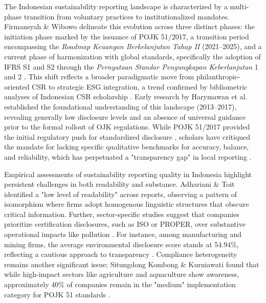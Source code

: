 \documentclass[english, online, cse, master]{dithesis}
\begin{document}
The Indonesian sustainability reporting landscape is characterized by a multi-phase transition from voluntary practices to institutionalized mandates. Firmansyah \& Wibowo  \parencite{amrie_firmansyah_200ee100} delineate this evolution across three distinct phases: the initiation phase marked by the issuance of POJK 51/2017, a transition period encompassing the \textit{Roadmap Keuangan Berkelanjutan Tahap II} (2021–2025), and a current phase of harmonization with global standards, specifically the adoption of IFRS S1 and S2 through the \textit{Pernyataan Standar Pengungkapan Keberlanjutan} 1 and 2  \parencite{amrie_firmansyah_200ee100}. This shift reflects a broader paradigmatic move from philanthropic-oriented CSR to strategic ESG integration, a trend confirmed by bibliometric analyses of Indonesian CSR scholarship  \parencite{boubacar_demba_barry_a607dad2}. Early research by Harymawan et al.  \parencite{iman_harymawan_2ef898fe} established the foundational understanding of this landscape (2013–2017), revealing generally low disclosure levels and an absence of universal guidance prior to the formal rollout of OJK regulations. While POJK 51/2017 provided the initial regulatory push for standardized disclosure  \parencite[]{alfonsa_roselina_purnomo_d67da232, kuat_waluyo_jati_45c636dc}, scholars have critiqued the mandate for lacking specific qualitative benchmarks for accuracy, balance, and reliability, which has perpetuated a "transparency gap" in local reporting  \parencite{atika_atika_588ee68a}.

Empirical assessments of sustainability reporting quality in Indonesia highlight persistent challenges in both readability and substance. Adhariani \& Toit  \parencite{desi_adhariani_toit_543335d6} identified a "low level of readability" across reports, observing a pattern of isomorphism where firms adopt homogenous linguistic structures that obscure critical information. Further, sector-specific studies suggest that companies prioritize certification disclosures, such as ISO or PROPER, over substantive operational impacts like pollution  \parencite{indah_fajarini_sri_wahyuningrum_1ce983fb}. For instance, among manufacturing and mining firms, the average environmental disclosure score stands at 54.94\%, reflecting a cautious approach to transparency  \parencite{indah_fajarini_sri_wahyuningrum_1ce983fb}. Compliance heterogeneity remains another significant issue; Situngdong Kombong \& Kurniawati  \parencite{christine_bawaeda_sitandung_kombong_d03ec902} found that while high-impact sectors like agriculture and aquaculture show awareness, approximately 40\% of companies remain in the "medium" implementation category for POJK 51 standards  \parencite{christine_bawaeda_sitandung_kombong_d03ec902}.
\end{document}

